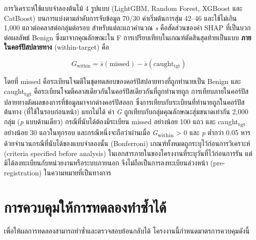 การวิเคราะห์ใช้แบบจำลองต้นไม้ 4 รูปแบบ (LightGBM, Random Forest, XGBoost และ CatBoost) บนการแบ่งตามลำดับการจับข้อมูล 70/30 ค่าเริ่มต้นการสุ่ม 42--46 และใช้ไม่เกิน 1,000 แถวต่อคลาสต่อกลุ่มต่อรอบ สำหรับแต่ละแถวคำนวณ \textit{s} คือสัดส่วนของค่า SHAP ที่เป็นบวกต่อผลลัพธ์ Benign ซึ่งมาจากคุณลักษณะใน F การเปรียบเทียบในเกณฑ์ตัดสินสุดท้ายเป็นแบบ \textbf{ภายในคอร์ปัสปลายทาง} (within-target) คือ

\begin{equation}
    G_{\mathrm{within}} = \bar{s}(\mathrm{missed}) - \bar{s}(\mathrm{caught_{tgt}})
\end{equation}

โดยที่ missed คือระเบียนโจมตีในชุดทดสอบของคอร์ปัสปลายทางที่ถูกทำนายเป็น Benign และ caught\textsubscript{tgt} คือระเบียนโจมตีคลาสเดียวกันในคอร์ปัสเดียวกันที่ถูกทำนายถูก การเทียบภายในคอร์ปัสปลายทางตัดผลของการที่ข้อมูลมาจากต่างคอร์ปัสออก ซึ่งการเทียบกับระเบียนที่ทำนายถูกในคอร์ปัสต้นทาง (ที่ใช้ในรอบก่อนหน้า) แยกไม่ได้ ค่า \textit{G} ถูกเทียบกับกลุ่มคุณลักษณะสุ่มขนาดเท่ากัน 2,000 กลุ่ม (\textit{p} แบบด้านเดียว) กรณีที่นับได้ต้องมีระเบียน missed อย่างน้อย 100 แถว และ caught\textsubscript{tgt} อย่างน้อย 30 แถวในทุกรอบ และกรณีหนึ่งจะถือว่าผ่านเมื่อ \textit{G}\textsubscript{within} > 0 และ \textit{p} ต่ำกว่า 0.05 หารด้วยจำนวนกรณีที่นับได้ของแบบจำลองนั้น (Bonferroni) เกณฑ์ทั้งหมดถูกระบุไว้ก่อนการวิเคราะห์ (criteria specified before analysis) ในเอกสารภายในของโครงงานที่ระบุวันที่ไว้ก่อนการรัน แต่มิได้ลงทะเบียนกับหน่วยงานหรือระบบภายนอก จึงไม่ถือเป็นการลงทะเบียนล่วงหน้า (pre-registration) ในความหมายที่เป็นทางการ

\section{การควบคุมให้การทดลองทำซ้ำได้}

เพื่อให้ผลการทดลองสามารถทำซ้ำและตรวจสอบย้อนกลับได้ โครงงานนี้กำหนดมาตรการควบคุมดังนี้

